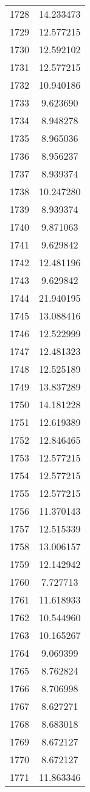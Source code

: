 \documentclass[12pt]{article}
\begin{document}
\begin{longtable}{@{}cc@{}}
1728 & 14.233473 \\
1729 & 12.577215 \\
1730 & 12.592102 \\
1731 & 12.577215 \\
1732 & 10.940186 \\
1733 & 9.623690 \\
1734 & 8.948278 \\
1735 & 8.965036 \\
1736 & 8.956237 \\
1737 & 8.939374 \\
1738 & 10.247280 \\
1739 & 8.939374 \\
1740 & 9.871063 \\
1741 & 9.629842 \\
1742 & 12.481196 \\
1743 & 9.629842 \\
1744 & 21.940195 \\
1745 & 13.088416 \\
1746 & 12.522999 \\
1747 & 12.481323 \\
1748 & 12.525189 \\
1749 & 13.837289 \\
1750 & 14.181228 \\
1751 & 12.619389 \\
1752 & 12.846465 \\
1753 & 12.577215 \\
1754 & 12.577215 \\
1755 & 12.577215 \\
1756 & 11.370143 \\
1757 & 12.515339 \\
1758 & 13.006157 \\
1759 & 12.142942 \\
1760 & 7.727713 \\
1761 & 11.618933 \\
1762 & 10.544960 \\
1763 & 10.165267 \\
1764 & 9.069399 \\
1765 & 8.762824 \\
1766 & 8.706998 \\
1767 & 8.627271 \\
1768 & 8.683018 \\
1769 & 8.672127 \\
1770 & 8.672127 \\
1771 & 11.863346 \\

\end{longtable}
\end{document}

